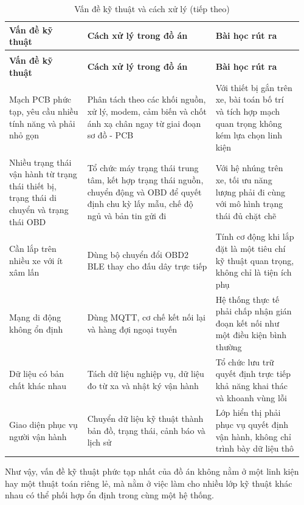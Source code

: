 \documentclass[a4paper]{extarticle}
\newcommand{\thesissettableid}[2]{%
  \renewcommand{\thetable}{#1}%
  \renewcommand{\theHtable}{#2}%
}
\begin{document}
{\thesissettableid{6.2}{condensed-bang-6-2-van-de-ky-thuat-va-cach-xu-ly}
\def\LTcaptype{table}
\begin{longtable}{|L{0.256\linewidth}|L{0.414\linewidth}|L{0.288\linewidth}|}
\caption{Vấn đề kỹ thuật và cách xử lý}\label{tab:condensed-bang-6-2-van-de-ky-thuat-va-cach-xu-ly}\\
\hline
\textbf{Vấn đề kỹ thuật} & \textbf{Cách xử lý trong đồ án} & \textbf{Bài học rút ra} \\
\hline
\endfirsthead
\caption[]{Vấn đề kỹ thuật và cách xử lý (tiếp theo)}\\
\hline
\textbf{Vấn đề kỹ thuật} & \textbf{Cách xử lý trong đồ án} & \textbf{Bài học rút ra} \\
\hline
\endhead
\endfoot
\endlastfoot
Mạch PCB phức tạp, yêu cầu nhiều tính năng và phải nhỏ gọn & Phân tách theo các khối nguồn, xử lý, modem, cảm biến và chốt ánh xạ chân ngay từ giai đoạn sơ đồ - PCB & Với thiết bị gắn trên xe, bài toán bố trí và tích hợp mạch quan trọng không kém lựa chọn linh kiện \\\hline
Nhiều trạng thái vận hành từ trạng thái thiết bị, trạng thái di chuyển và trạng thái OBD & Tổ chức máy trạng thái trung tâm, kết hợp trạng thái nguồn, chuyển động và OBD để quyết định chu kỳ lấy mẫu, chế độ ngủ và bản tin gửi đi & Với hệ nhúng trên xe, tối ưu năng lượng phải đi cùng với mô hình trạng thái đủ chặt chẽ \\\hline
Cần lắp trên nhiều xe với ít xâm lấn & Dùng bộ chuyển đổi OBD2 BLE thay cho đấu dây trực tiếp & Tính cơ động khi lắp đặt là một tiêu chí kỹ thuật quan trọng, không chỉ là tiện ích phụ \\\hline
Mạng di động không ổn định & Dùng MQTT, cơ chế kết nối lại và hàng đợi ngoại tuyến & Hệ thống thực tế phải chấp nhận gián đoạn kết nối như một điều kiện bình thường \\\hline
Dữ liệu có bản chất khác nhau & Tách dữ liệu nghiệp vụ, dữ liệu đo từ xa và nhật ký vận hành & Tổ chức lưu trữ quyết định trực tiếp khả năng khai thác và khoanh vùng lỗi \\\hline
Giao diện phục vụ người vận hành & Chuyển dữ liệu kỹ thuật thành bản đồ, trạng thái, cảnh báo và lịch sử & Lớp hiển thị phải phục vụ quyết định vận hành, không chỉ trình bày dữ liệu thô \\\hline
\end{longtable}
}

Như vậy, vấn đề kỹ thuật phức tạp nhất của đồ án không nằm ở một linh kiện hay
một thuật toán riêng lẻ, mà nằm ở việc làm cho nhiều lớp kỹ thuật khác nhau có
thể phối hợp ổn định trong cùng một hệ thống.
\end{document}
